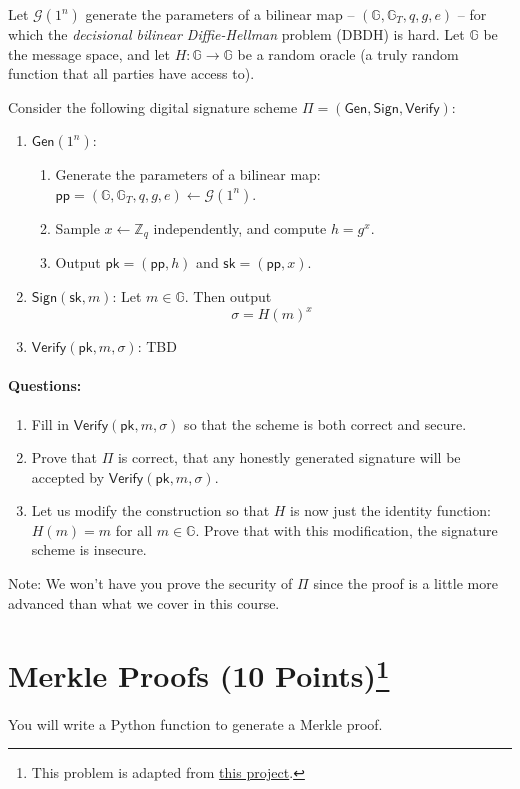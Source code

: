\documentclass[11pt]{article}
\numberwithin{equation}{section}
\newcommand{\gen}{\mathsf{Gen}}
\newcommand{\sign}{\mathsf{Sign}}
\newcommand{\verify}{\mathsf{Verify}}
\newcommand{\pk}{\mathsf{pk}}
\newcommand{\sk}{\mathsf{sk}}
\newcommand{\params}{\mathsf{pp}}
\newcommand{\G}{\mathcal{G}}
\newcommand{\GG}{\mathbb{G}}
\newcommand{\ZZ}{\mathbb{Z}}
\begin{document}
Let $\G(1^n)$ generate the parameters of a bilinear map -- $(\GG, \GG_T, q, g, e)$ -- for which the \textit{decisional bilinear Diffie-Hellman} problem (DBDH) is hard. Let $\GG$ be the message space, and let $H: \GG \to \GG$ be a random oracle (a truly random function that all parties have access to).

Consider the following digital signature scheme $\Pi = (\gen, \sign, \verify)$:
\begin{enumerate}
\item $\gen(1^n)$: 
\begin{enumerate}
    \item Generate the parameters of a bilinear map: $\params = (\GG, \GG_T, q, g, e) \leftarrow \G(1^n)$.
    \item Sample $x \leftarrow \ZZ_q$ independently, and compute $h = g^{x}$.
    \item Output $\pk=(\params, h)$ and $\sk = (\params, x)$.
\end{enumerate}

\item $\sign(\sk, m)$: Let $m \in \GG$. Then output 
\[\sigma = H(m)^{x}\]
\item $\verify(\pk, m, \sigma)$: TBD
\end{enumerate}

\paragraph{Questions:}
\begin{enumerate}
    \item Fill in $\verify(\pk, m, \sigma)$ so that the scheme is both correct and secure.
    \item Prove that $\Pi$ is correct, that any honestly generated signature will be accepted by $\verify(\pk, m, \sigma)$.
    \item Let us modify the construction so that $H$ is now just the identity function: $H(m) = m$ for all $m \in \GG$. Prove that with this modification, the signature scheme is insecure.
\end{enumerate}

Note: We won't have you prove the security of $\Pi$ since the proof is a little more advanced than what we cover in this course. \\
\pagebreak


\section{Merkle Proofs (10 Points)\footnote{This problem is adapted from \href{https://cs251.stanford.edu/hw/proj1.pdf}{this project}.}}
You will write a Python function to generate a Merkle proof.\\ 
\end{document}
